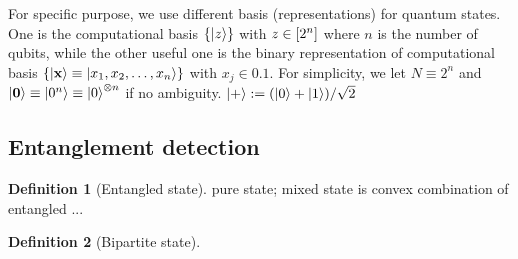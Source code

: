 \documentclass[
aps,
pra,
linenumbers,
floatfix,
]{revtex4-2}
\theoremstyle{plain}
\theoremstyle{definition}
\newtheorem{definition}{Definition}
\begin{document}
For specific purpose, we use different basis (representations) for quantum states.
One is the computational basis $\qty{\ket{z}}$ with $z\in \qty[2^n]$ where $n$ is the number of qubits,
while the other useful one is the binary representation of computational basis $\qty{\ket{\vb{x}}\equiv\ket{x_1,x_2,\dots,x_n}}$ with $x_j\in \qty{0,1}$. 
For simplicity, we let $N \equiv 2^n$ and $\ket{\vb{0}}\equiv\ket{0^n} \equiv\ket{0}^{\otimes n}$ if no ambiguity.
$\ket{+}: = (\ket{0}+\ket{1})/\sqrt{2} $

\subsection{Entanglement detection}
\begin{definition}[Entangled state]
	pure state; mixed state is convex combination of entangled ...
\end{definition}
\begin{definition}[Bipartite state]
\end{definition}
\end{document}

